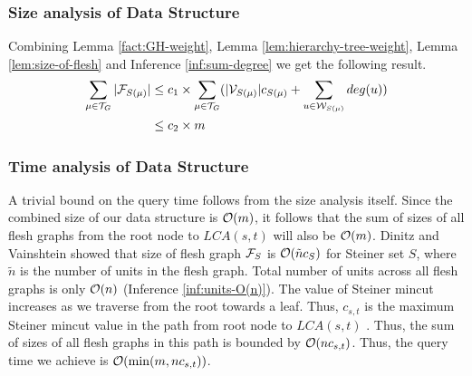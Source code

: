 \subsubsection*{Size analysis of Data Structure}
Combining Lemma \ref{fact:GH-weight}, Lemma \ref{lem:hierarchy-tree-weight}, Lemma \ref{lem:size-of-flesh} and Inference \ref{inf:sum-degree} we get the following result.
\begin{equation*}
    \begin{split}
        \nonumber
        \sum_{\mu \in {\cal T}_G}|{\cal F}_{S(\mu)}| &\leq c_1 \times \sum_{\mu \in {\cal T}_G} (|{\cal V}_{S(\mu)}|c_{S(\mu)} + \sum_{u\in {\cal W}_{S(\mu)}}deg(u))\\
        &\leq c_2 \times m
    \end{split}
\end{equation*}


\subsubsection*{Time analysis of Data Structure}

A trivial bound on the query time follows from the size analysis itself. Since the combined size of our data structure is ${\cal O}(m)$, it follows that the sum of sizes of all flesh graphs from the root node to $LCA(s,t)$ will also be ${\cal O}(m)$. Dinitz and Vainshtein \cite{DBLP:conf/stoc/DinitzV94} showed that size of flesh graph ${\cal F}_S$ is ${\cal O}(\tilde{n}c_S)$ for Steiner set $S$, where $\tilde{n}$ is the number of units in the flesh graph. Total number of units across all flesh graphs is only ${\cal O}(n)$ (Inference \ref{inf:units-O(n)}). The value of Steiner mincut increases as we traverse from the root towards a leaf. Thus, $c_{s,t}$ is the maximum Steiner mincut value in the path from root node to $LCA(s,t)$ . Thus, the sum of sizes of all flesh graphs in this path is bounded by ${\cal O}(nc_{s,t})$. Thus, the query time we achieve is ${\cal O}(\min(m,nc_{s,t}))$.
